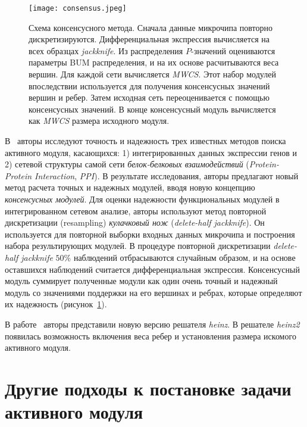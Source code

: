 \begin{figure}
    \centering
    \texttt{[image: consensus.jpeg]}
    \caption{
        Схема консенсусного метода.  Сначала данные микрочипа повторно
        дискретизируются.  Дифференциальная экспрессия вычисляется на всех
        образцах \emph{jackknife}.  Из распределения $P$-значений оцениваются
        параметры BUM распределения, и на их основе расчитываются веса вершин.
        Для каждой сети вычисляется \emph{MWCS}. Этот набор модулей впоследствии
        используется для получения консенсусных значений вершин и ребер.  Затем
        исходная сеть переоценивается с помощью консенсусных значений.  В конце
        консенсусный модуль вычисляется как \emph{MWCS} размера исходного модуля.
    }
    \label{consensus}
\end{figure}

В~\cite{Beisser2012} авторы исследуют точность и надежность трех известных
методов поиска активного модуля, касающихся:
1) интегрированных данных экспрессии генов и
2) сетевой структуры самой сети \emph{белок-белковых взаимодействий}
   (\emph{Protein-Protein Interaction}, \emph{PPI}).  В результате
   исследования, авторы предлагают новый метод расчета точных и надежных
   модулей, вводя новую концепцию \emph{консенсусных модулей}.  Для оценки
   надежности функциональных модулей в интегрированном сетевом анализе, авторы
   используют метод повторной дискретизации (resampling) \emph{кулачковый нож}
   (\emph{delete-half jackknife}). Он используется для повторной выборки
   входных данных микрочипа и построения набора результирующих модулей.
   В процедуре повторной дискретизации \emph{delete-half jackknife} $50\%$ наблюдений
   отбрасываются случайным образом, и на основе оставшихся наблюдений считается
   дифференциальная экспрессия.  Консенсусный модуль суммирует полученные
   модули как один очень точный и надежный модуль со значениями поддержки на
   его вершинах и ребрах, которые определяют их надежность
   (рисунок~\ref{consensus}).

В работе~\cite{Beisser2012} авторы представили новую версию решателя
\emph{heinz}.  В решателе \emph{heinz2} появилась возможность включения веса
ребер и установления размера искомого активного модуля.

\section{Другие подходы к постановке задачи активного
модуля}

